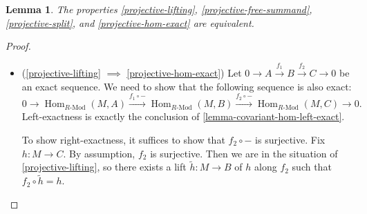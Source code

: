 \documentclass[11pt]{article}
\newcommand{\Hom}{\operatorname{Hom}}
\newcommand{\RHom}[3]{\Hom_{{#1}\text{-Mod}}({#2}, {#3})}
\newcommand{\wt}{\widetilde}
\theoremstyle{plain}
\newtheorem{lemma}{Lemma}[section]
\theoremstyle{definition}
\begin{document}
\begin{lemma}\label{lemma-projective-equivalent}
  The properties \ref{projective-lifting}, \ref{projective-free-summand}, \ref{projective-split}, and \ref{projective-hom-exact} are equivalent.
\end{lemma}
\begin{proof}
  \begin{itemize}
  \item (\ref{projective-lifting} \(\implies\) \ref{projective-hom-exact})
    Let \(0 \to A \overset{f_1}{\to} B \overset{f_2}{\to} C \to 0\) be an exact sequence. We need to show that the following sequence is also exact:
    \[0 \to \RHom{R}{M}{A} \overset{f_1 \circ -}{\to} \RHom{R}{M}{B} \overset{f_2 \circ -}{\to} \RHom{R}{M}{C} \to 0.\]
    Left-exactness is exactly the conclusion of \ref{lemma-covariant-hom-left-exact}.

    To show right-exactness, it suffices to show that \(f_2 \circ -\) is surjective. Fix \(h : M \to C\). By assumption, \(f_2\) is surjective. Then we are in the situation of \ref{projective-lifting}, so there exists a lift \(\wt{h} : M \to B\) of \(h\) along \(f_2\) such that \(f_2 \circ \wt{h} = h\).


\end{itemize}
\end{proof}
\end{document}
